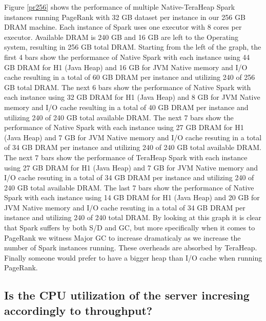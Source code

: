 Figure \ref{pr256} shows the performance of multiple Native-TeraHeap
Spark instances running PageRank with 32 GB dataset per instance in
our 256 GB DRAM machine. Each instance of Spark uses one executor with
8 cores per executor. Available DRAM is 240 GB and 16 GB are left to
the Operating system, resulting in 256 GB total DRAM. Starting from
the left of the graph, the first 4 bars show the performance of Native
Spark with each instance using 44 GB DRAM for H1 (Java Heap) and 16 GB
for JVM Native memory and I/O cache resulting in a total of 60 GB DRAM
per instance and utilizing 240 of 256 GB total DRAM. The next 6 bars
show the performance of Native Spark with each instance using 32 GB
DRAM for H1 (Java Heap) and 8 GB for JVM Native memory and I/O cache
resulting in a total of 40 GB DRAM per instance and utilizing 240 of
240 GB total available DRAM. The next 7 bars show the performance of
Native Spark with each instance using 27 GB DRAM for H1 (Java Heap)
and 7 GB for JVM Native memory and I/O cache resuting in a total of 34
GB DRAM per instance and utilizing 240 of 240 GB total available DRAM.
The next 7 bars show the performance of TeraHeap Spark with each
instance using 27 GB DRAM for H1 (Java Heap) and 7 GB for JVM Native
memory and I/O cache resuting in a total of 34 GB DRAM per instance
and utilizing 240 of 240 GB total available DRAM. The last 7 bars show
the performance of Native Spark with each instance using 14 GB DRAM
for H1 (Java Heap) and 20 GB for JVM Native memory and I/O cache
resuting in a total of 34 GB DRAM per instance and utilizing 240 of
240 total DRAM. By looking at this graph it is clear that Spark
suffers by both S/D and GC, but more specifically when it comes to
PageRank we witness Major GC to increase dramaticaly as we increase
the number of Spark instances running. These overheads are absorbed by
TeraHeap. Finally someone would prefer to have a bigger heap than I/O
cache when running PageRank.

\subsection{Is the CPU utilization of the server incresing
accordingly to throughput?}

